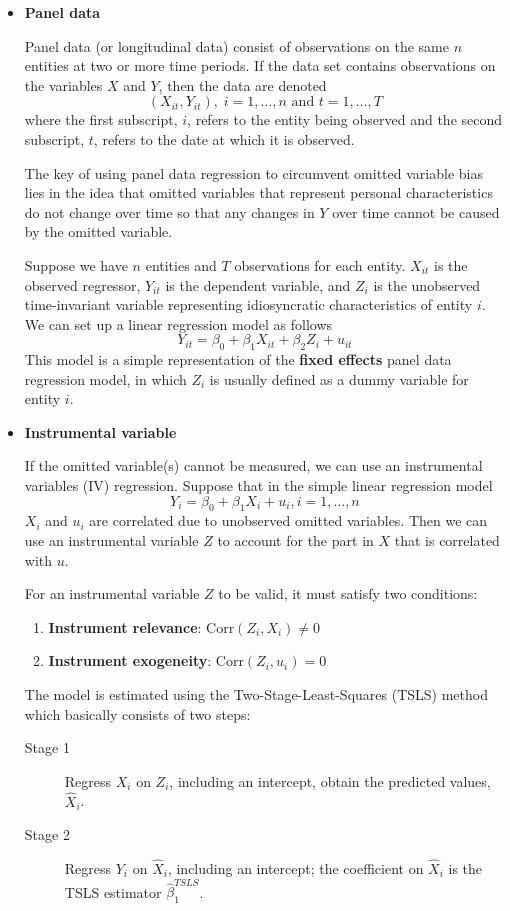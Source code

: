\documentclass[a4paper,11pt]{article}
\newcommand{\corr}{\mathrm{Corr}}
\begin{document}
\begin{itemize}
\item \textbf{Panel data}
\label{sec:org07fc9d1}

Panel data (or longitudinal data) consist of observations on the same \(n\) entities at two or
more time periods. If the data set contains observations on the
variables \(X\) and \(Y\), then the data are denoted
\[ (X_{it}, Y_{it}),\; i = 1, \ldots, n \text{ and } t = 1, \ldots, T \]
where the first subscript, \(i\), refers to the entity being observed
and the second subscript, \(t\), refers to the date at which it is
observed. 

The key of using panel data regression to circumvent omitted variable
bias lies in the idea that omitted variables that represent personal
characteristics do not change over time so that any changes in \(Y\)
over time cannot be caused by the omitted variable.

Suppose we have \(n\) entities and \(T\) observations for each
entity. \(X_{it}\) is the observed regressor, \(Y_{it}\) is the dependent
variable, and \(Z_i\) is the unobserved time-invariant variable
representing idiosyncratic characteristics of entity \(i\). We can set
up a linear regression model as follows 
\[ Y_{it} = \beta_0 + \beta_1 X_{it} +
\beta_2 Z_i + u_{it} \] 
This model is a simple representation of the \textbf{fixed effects} panel
data regression model, in which \(Z_i\) is usually defined as a dummy
variable for entity \(i\). 

\item \textbf{Instrumental variable}
\label{sec:org402643d}

If the omitted variable(s) cannot be measured, we can use an instrumental
variables (IV) regression. Suppose that in the simple linear
regression model
\[ Y_i = \beta_0 + \beta_1 X_i + u_i, i = 1, \ldots, n \]
\(X_i\) and \(u_i\) are correlated due to unobserved omitted
variables. Then we can use an instrumental variable \(Z\) to account for
the part in \(X\) that is correlated with \(u\). 

For an instrumental variable \(Z\) to be valid, it
must satisfy two conditions: 
\begin{enumerate}
\item \textbf{Instrument relevance}: \(\corr(Z_i, X_i) \neq 0\)
\item \textbf{Instrument exogeneity}: \(\corr(Z_i, u_i) = 0\)
\end{enumerate}

The model is estimated using the Two-Stage-Least-Squares (TSLS) method
which basically consists of two steps:
\begin{description}
\item[{Stage 1}] Regress \(X_i\) on \(Z_i\), including an intercept, obtain
the predicted values, \(\hat{X}_i\).
\item[{Stage 2}] Regress \(Y_i\) on \(\hat{X}_i\), including an intercept; the
coefficient on \(\hat{X}_i\) is the TSLS estimator
\(\hat{\beta}_1^{TSLS}\).
\end{description}


\end{itemize}
\end{document}
